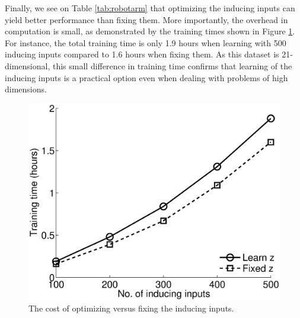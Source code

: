 Finally, we see on Table \ref{tab:robotarm}  that optimizing the inducing inputs can yield better performance than fixing them.
More importantly, the overhead in computation is small, as demonstrated by the training times shown in Figure \ref{fig:time}.
For instance, the total training time is only 1.9 hours when learning with 500 inducing inputs compared to 1.6 hours when fixing them.
As this dataset is 21-dimensional, this small difference in training time confirms that learning of the inducing inputs is a practical option even when dealing with problems of high dimensions.
\begin{figure}
\includegraphics[width=0.7\linewidth]{figures/sarcosTime.eps}
\caption{The cost of optimizing versus fixing the inducing inputs.}
\label{fig:time}
\end{figure}
